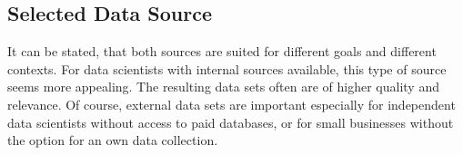 	\subsection{Selected Data Source}
	It can be stated, that both sources are suited for different goals and different contexts. For data scientists with internal sources available, this type of source seems more appealing. The resulting data sets often are of higher quality and relevance. Of course, external data sets are important especially for independent data scientists without access to paid databases, or for small businesses without the option for an own data collection.
	
